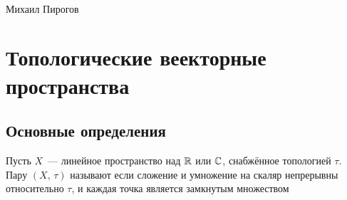 \documentclass{notes}
\begin{document}
	\begin{center}
		\huge{} \\
		\vspace{0.5em}
		\large{Михаил Пирогов}
	\end{center}
	\vspace{0.5em}

	\section{Топологические веекторные пространства}

	\subsection{Основные определения}

	\begin{de}
		Пусть $X$~--- линейное пространство над $\mathbb{R}$ или $\mathbb{C}$, снабжённое топологией $\tau$. Пару $(X, \, \tau)$ называют  если сложение и умножение на скаляр непрерывны относительно $\tau$, и каждая точка является замкнутым множеством
	\end{de}
\end{document}
